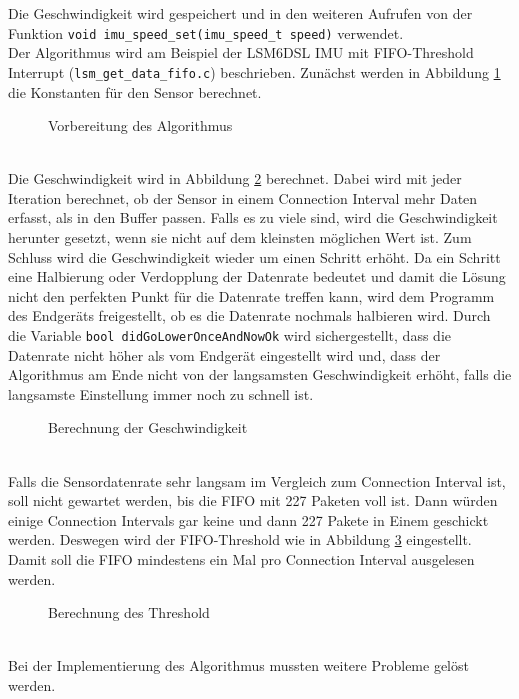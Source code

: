 Die Geschwindigkeit wird gespeichert und in den weiteren Aufrufen von der Funktion \texttt{void imu\_speed\_set(\allowbreak{}imu\_speed\_t speed)} verwendet.\\
Der Algorithmus wird am Beispiel der LSM6DSL IMU mit FIFO-Threshold Interrupt (\texttt{lsm\_get\_data\_fifo.c}) beschrieben.
Zunächst werden in Abbildung \ref{lst:algoPre} die Konstanten für den Sensor berechnet.
\begin{figure}[h!]

	\caption{Vorbereitung des Algorithmus}
	\label{lst:algoPre}
\end{figure}\\
Die Geschwindigkeit wird in Abbildung \ref{lst:algo} berechnet.
Dabei wird mit jeder Iteration berechnet, ob der Sensor in einem Connection Interval mehr Daten erfasst, als in den Buffer passen.
Falls es zu viele sind, wird die Geschwindigkeit herunter gesetzt, wenn sie nicht auf dem kleinsten möglichen Wert ist.
Zum Schluss wird die Geschwindigkeit wieder um einen Schritt erhöht.
Da ein Schritt eine Halbierung oder Verdopplung der Datenrate bedeutet und damit die Lösung nicht den perfekten Punkt für die Datenrate treffen kann, wird dem Programm des Endgeräts freigestellt, ob es die Datenrate nochmals halbieren wird.
Durch die Variable \texttt{bool didGoLowerOnceAndNowOk} wird sichergestellt, dass die Datenrate nicht höher als vom Endgerät eingestellt wird und, dass der Algorithmus am Ende nicht von der langsamsten Geschwindigkeit erhöht, falls die langsamste Einstellung immer noch zu schnell ist.
\begin{figure}[h!]

	\caption{Berechnung der Geschwindigkeit}
	\label{lst:algo}
\end{figure}\\
Falls die Sensordatenrate sehr langsam im Vergleich zum Connection Interval ist, soll nicht gewartet werden, bis die FIFO mit 227 Paketen voll ist.
Dann würden einige Connection Intervals gar keine und dann 227 Pakete in Einem geschickt werden.
Deswegen wird der FIFO-Threshold wie in Abbildung \ref{lst:algoPost} eingestellt.
Damit soll die FIFO mindestens ein Mal pro Connection Interval ausgelesen werden.
\begin{figure}[h!]

	\caption{Berechnung des Threshold}
	\label{lst:algoPost}
\end{figure}\\
Bei der Implementierung des Algorithmus mussten weitere Probleme gelöst werden.\\\\
